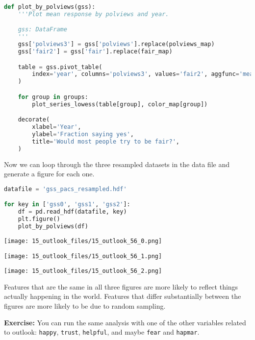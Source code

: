 \begin{lstlisting}[language=Python,style=source]
def plot_by_polviews(gss):
    '''Plot mean response by polviews and year.

    gss: DataFrame
    '''
    gss['polviews3'] = gss['polviews'].replace(polviews_map)
    gss['fair2'] = gss['fair'].replace(fair_map)

    table = gss.pivot_table(
        index='year', columns='polviews3', values='fair2', aggfunc='mean'
    )

    for group in groups:
        plot_series_lowess(table[group], color_map[group])

    decorate(
        xlabel='Year',
        ylabel='Fraction saying yes',
        title='Would most people try to be fair?',
    )
\end{lstlisting}

Now we can loop through the three resampled datasets in the data file
and generate a figure for each one.

\begin{lstlisting}[language=Python,style=source]
datafile = 'gss_pacs_resampled.hdf'

for key in ['gss0', 'gss1', 'gss2']:
    df = pd.read_hdf(datafile, key)
    plt.figure()
    plot_by_polviews(df)
\end{lstlisting}

\begin{center}
\texttt{[image: 15\_outlook\_files/15\_outlook\_56\_0.png]}
\end{center}

\begin{center}
\texttt{[image: 15\_outlook\_files/15\_outlook\_56\_1.png]}
\end{center}

\begin{center}
\texttt{[image: 15\_outlook\_files/15\_outlook\_56\_2.png]}
\end{center}

Features that are the same in all three figures are more likely to
reflect things actually happening in the world. Features that differ
substantially between the figures are more likely to be due to random
sampling.

\textbf{Exercise:} You can run the same analysis with one of the other
variables related to outlook: \passthrough{\lstinline!happy!},
\passthrough{\lstinline!trust!}, \passthrough{\lstinline!helpful!}, and
maybe \passthrough{\lstinline!fear!} and
\passthrough{\lstinline!hapmar!}.


